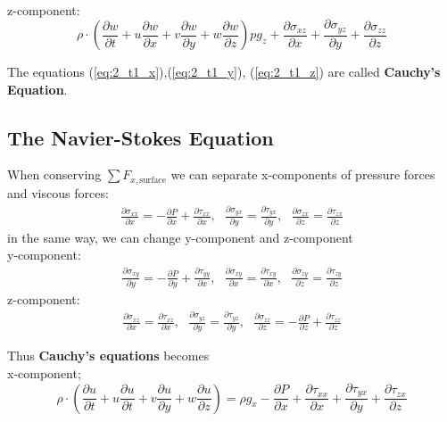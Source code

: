 \documentclass[11pt]{report}
\newcommand{\refn}[1]{(\ref{#1})}
\newcommand{\refx}[1]{\refn{eq:#1}}
\newcommand{\bt}[1]{\textbf{#1}}
\newcommand{\dsp}{\displaystyle}
\newcommand{\NI}{\noindent}
\begin{document}
	{~}\\
	\NI z-component:
	\begin{equation}
		\rho \cdot \left(\frac{\partial w}{\partial t} + u\frac{\partial w}{\partial x} + v\frac{\partial w}{\partial y} + w\frac{\partial w}{\partial z}\right) pg_z +  \frac{\partial \sigma_{xz}}{\partial x} + \frac{\partial \sigma_{yz}}{\partial y} + \frac{\partial \sigma_{zz}}{\partial z}\tag{z} \label{eq:2_t1_z}
	\end{equation}
	
	\NI The equations \refx{2_t1_x},\refx{2_t1_y}, \refx{2_t1_z} are called \bt{Cauchy's Equation}.
	
	\subsection{The Navier-Stokes Equation}
	When conserving $\dsp \sum F_{x,\text{surface}}$ we can separate x-components of pressure forces and viscous forces:
	\begin{eqnarray*}
		\frac{\partial \sigma_{xx}}{\partial x} = - \frac{\partial P}{\partial x} + \frac{\partial \tau_{xx}}{\partial x}, ~~~ \frac{\partial \sigma_{yx}}{\partial y} = \frac{\partial \tau_{yx}}{\partial y}, ~~~ \frac{\partial \sigma_{zx}}{\partial z} = \frac{\partial \tau_{zx}}{\partial z}
	\end{eqnarray*}
	in the same way, we can change y-component and z-component\\
	y-component:
	\begin{eqnarray*}
		\frac{\partial \sigma_{xy}}{\partial y} = - \frac{\partial P}{\partial y} + \frac{\partial \tau_{yy}}{\partial x}, ~~~ \frac{\partial \sigma_{xy}}{\partial x} = \frac{\partial \tau_{xy}}{\partial x}, ~~~ \frac{\partial \sigma_{zy}}{\partial z} = \frac{\partial \tau_{zy}}{\partial z}
	\end{eqnarray*}
	z-component:
	\begin{eqnarray*}
		\frac{\partial \sigma_{xz}}{\partial x} = \frac{\partial \tau_{xz}}{\partial x}, ~~~ \frac{\partial \sigma_{yz}}{\partial y} = \frac{\partial \tau_{yz}}{\partial y}, ~~~ \frac{\partial \sigma_{zz}}{\partial z} = - \frac{\partial P}{\partial z} +  \frac{\partial \tau_{zz}}{\partial z}
	\end{eqnarray*}
	
	\NI Thus \bt{Cauchy's equations} becomes\\
	x-component;
	\begin{equation*}
		\rho \cdot \left(\frac{\partial u}{\partial t} + u\frac{\partial u}{\partial t} + v\frac{\partial u}{\partial y}+ w \frac{\partial u}{\partial z}\right) = \rho g_x - \frac{\partial P}{\partial x} + \frac{\partial \tau_{xx}}{\partial x} + \frac{\partial \tau_{yx}}{\partial y} + \frac{\partial \tau_{zx}}{\partial z}
	\end{equation*}
	
\end{document}
